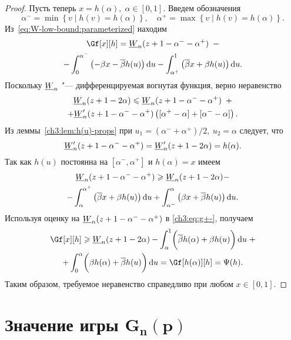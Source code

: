 {\begin{proof}
  Пусть теперь $x = h(\alpha), \; \alpha \in [0, 1]$. Введем обозначения
  \[
    \alpha^- = \min \left\{ v \;|\; h(v) = h(\alpha) \right\}, \quad \alpha^+ =
    \max \left\{ v \;|\; h(v) = h(\alpha) \right\}.
  \]
  Из~\eqref{eq:W-low-bound:parameterized} находим
  \begin{multline}\label{ch3:eq:g+-}
    \Gf[x][h] = \LW{n}(z + 1 - \alpha^- - \alpha^+) \enskip - \\
    - \int_0^{\alpha^-} \left(-\Co x - \DCo h(u)\right) \di u -
    \int_{\alpha^+}^1 \left(\DCo x + \Co h(u)\right) \di u.
  \end{multline}
  Поскольку $\LW{n}$ "--- дифференцируемая вогнутая функция, верно неравенство
  \begin{multline*}
    \LW{n}(z + 1 - 2\alpha) \leqslant \LW{n}(z + 1 - \alpha^- - \alpha^+) \enskip +\\
    + \LW[\prime]{n}(z + 1 - \alpha^- - \alpha^+) \left( [ \alpha^+ - \alpha ] + [
      \alpha^- - \alpha ] \right).
  \end{multline*}
  Из леммы~\ref{ch3:lem:h(u)-props} при $u_1 = (\alpha^- + \alpha^+)/2,\: u_2 = \alpha$ следует, что
  \[
    \LW[\prime]{n}(z + 1 - \alpha^- - \alpha^+) = \LW[\prime]{n}(z + 1 - 2\alpha) =
    h(\alpha).
  \]
  Так как $h(u)$ постоянна на $[\alpha^-, \alpha^+]$ и $h(\alpha) = x$ имеем
  \begin{multline*}
    \LW{n}(z + 1 - \alpha^- - \alpha^+) \geqslant \LW{n}(z + 1 - 2\alpha) - \\
    - \int_\alpha^{\alpha^+} \left( \DCo x + \Co h(u) \right) \di u +
    \int_{\alpha^-}^\alpha \left( \Co x + \DCo h(u) \right) \di u.
  \end{multline*}
  Используя оценку на $\LW{n}(z + 1 - \alpha^- - \alpha^+)$ в \eqref{ch3:eq:g+-}, получаем
  \begin{multline*}
    \Gf[x][h] \geqslant \LW{n}(z + 1 - 2\alpha)
    - \int_\alpha^1 \biggl( \DCo h(\alpha) + \Co h(u) \biggr) \di u \; + \\
    + \int_0^\alpha \biggl( \Co h(\alpha) + \DCo h(u) \biggr) \di u =
    \Gf[h(\alpha)][h] = \Psi(h).
  \end{multline*}
  Таким образом, требуемое неравенство справедливо при любом $x \in [0, 1]$.
\end{proof}

\section{Значение игры $\mathbf{G_n\left(p\right)}$}
\label{ch3:sec:game-value}

}
